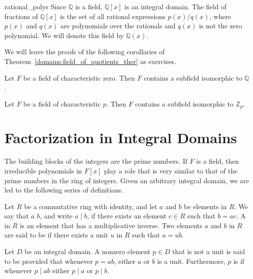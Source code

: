 \begin{example}{rational_polys}
Since ${\mathbb Q}$ is a field, ${\mathbb Q}[x]$ is an integral domain. The
field of fractions of ${\mathbb Q}[x]$ is the set of all rational
expressions $p(x)/q(x)$, where $p(x)$ and $q(x)$ are polynomials over
the rationals and $q(x)$ is not the zero polynomial. We will denote 
this field by ${\mathbb Q}(x)$.\label{noteratpoly} 
\end{example}

 

We will leave the proofs of the following corollaries of Theorem~\ref{domains:field_of_quotients_ther}
as exercises. 
 

\begin{corollary}\label{domains:char_zero_rationals_corollary}
Let $F$ be a field of characteristic zero. Then $F$ contains a
subfield isomorphic to ${\mathbb Q}$.	       
\end{corollary}


\begin{corollary}\label{domains:char_p_Zp_corollary}
Let $F$ be a field of characteristic $p$. Then $F$ contains a
subfield isomorphic to ${\mathbb Z}_p$.	       
\end{corollary}
 


\section{Factorization in Integral Domains}

 
The building blocks of the integers are the prime numbers.  If $F$ is
a field, then irreducible polynomials in $F[x]$ play a role that is
very similar to that of the prime numbers in the ring of integers.
Given an arbitrary integral domain, we are led to the following
series of definitions. 
 

Let $R$ be a commutative ring with identity, and let $a$ and $b$ be
elements in $R$.  We say that $a$  $b$, and write $a \mid
b$, if there exists an element $c \in R$ such that $b = ac$.  A  in $R$ is an element that has a multiplicative
inverse.  Two elements $a$ and $b$ in $R$ are said to be  if
there exists a unit $u$ in $R$ such that $a = ub$.   
 

Let $D$ be an integral domain.  A nonzero element $p \in D$ that is
not a unit is said to be 
provided that whenever $p = ab$, either $a$ or $b$ is a unit.
Furthermore, $p$ is  if whenever $p \mid
ab$ either $p \mid a$ or $p \mid b$.


